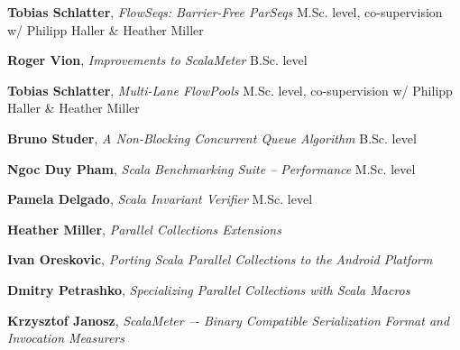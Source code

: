 \documentclass[9pt]{article}
\begin{document}
\noindent
{\bf Tobias Schlatter},
{\em FlowSeqs: Barrier-Free ParSeqs}
\newline\noindent M.Sc. level, co-supervision w/ Philipp Haller \& Heather Miller
\medskip

\noindent
{\bf Roger Vion},
{\em Improvements to ScalaMeter}
\newline\noindent B.Sc. level
\medskip

\noindent
{\bf Tobias Schlatter},
{\em Multi-Lane FlowPools}
\newline\noindent M.Sc. level, co-supervision w/ Philipp Haller \& Heather Miller
\medskip

\noindent
{\bf Bruno Studer},
{\em A Non-Blocking Concurrent Queue Algorithm}
\newline\noindent B.Sc. level
\medskip

\noindent
{\bf Ngoc Duy Pham},
{\em Scala Benchmarking Suite -- Performance}
\newline{}
\newline\noindent M.Sc. level
\medskip

\noindent
{\bf Pamela Delgado},
{\em Scala Invariant Verifier}
\newline\noindent M.Sc. level
\medskip

\bigskip

\medskip
{}

\noindent
{\bf Heather Miller},
{\em Parallel Collections Extensions}
\medskip

\noindent
{\bf Ivan Oreskovic},
{\em Porting Scala Parallel Collections to the }
\newline\noindent
{\em Android Platform}
\dates{}
\medskip

\noindent
{\bf Dmitry Petrashko},
{\em Specializing Parallel Collections with Scala Macros}
\medskip

\noindent
{\bf Krzysztof Janosz},
{\em ScalaMeter –- Binary Compatible Serialization }
\newline\noindent
{\em Format and Invocation Measurers}
\dates{}
\medskip
\end{document}
